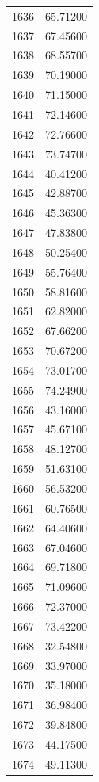 \documentclass[
  letterpaper,
  DIV=11,
  numbers=noendperiod]{scrreprt}
\begin{document}
\begin{tcolorbox}
\begin{tabular}{lr}
1636 &         65.71200 \\
1637 &         67.45600 \\
1638 &         68.55700 \\
1639 &         70.19000 \\
1640 &         71.15000 \\
1641 &         72.14600 \\
1642 &         72.76600 \\
1643 &         73.74700 \\
1644 &         40.41200 \\
1645 &         42.88700 \\
1646 &         45.36300 \\
1647 &         47.83800 \\
1648 &         50.25400 \\
1649 &         55.76400 \\
1650 &         58.81600 \\
1651 &         62.82000 \\
1652 &         67.66200 \\
1653 &         70.67200 \\
1654 &         73.01700 \\
1655 &         74.24900 \\
1656 &         43.16000 \\
1657 &         45.67100 \\
1658 &         48.12700 \\
1659 &         51.63100 \\
1660 &         56.53200 \\
1661 &         60.76500 \\
1662 &         64.40600 \\
1663 &         67.04600 \\
1664 &         69.71800 \\
1665 &         71.09600 \\
1666 &         72.37000 \\
1667 &         73.42200 \\
1668 &         32.54800 \\
1669 &         33.97000 \\
1670 &         35.18000 \\
1671 &         36.98400 \\
1672 &         39.84800 \\
1673 &         44.17500 \\
1674 &         49.11300 \\

\end{tabular}
\end{tcolorbox}
\end{document}
